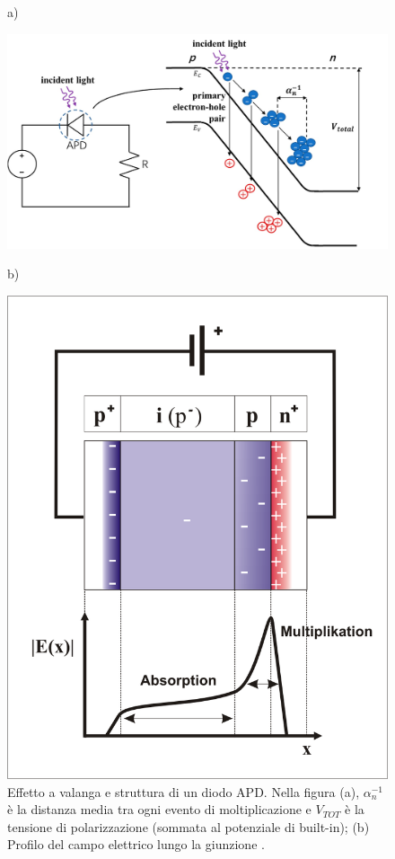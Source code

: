 \begin{figure}[tbh]
	\centering
	a)
	\begin{minipage}{.60\textwidth}
		\includegraphics[width=\linewidth]{./ImageFiles/APD.jpg}
	\end{minipage}
	b)
	\begin{minipage}{.30\textwidth}
		\includegraphics[width=\linewidth]{./ImageFiles/APD2_German.png}
	\end{minipage}
	\caption{Effetto a valanga e struttura di un diodo APD. Nella figura (a), $\alpha_n^{-1}$ è la distanza media tra ogni evento di moltiplicazione e $V_{TOT}$ è la tensione di polarizzazione (sommata al potenziale di built-in); (b) Profilo del campo elettrico lungo la giunzione \cite{Jiang2019}\cite{ApdImage}.} 
	\label{fig:apd}
\end{figure}
